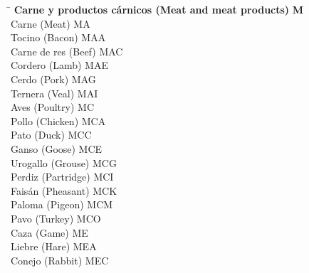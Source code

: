 \begin{small}
    \begin{tabbing}
    \hspace{15cm} \= \hspace{0cm} \kill
        \textbf{Carne y productos cárnicos (Meat and meat products)} \> \textbf{M} \\
            \hspace{0.5cm}Carne (Meat) \> MA \\
                \hspace{1cm}Tocino (Bacon) \> MAA \\
                \hspace{1cm}Carne de res (Beef) \> MAC \\
                \hspace{1cm}Cordero (Lamb) \> MAE \\
                \hspace{1cm}Cerdo (Pork) \> MAG \\
                \hspace{1cm}Ternera (Veal) \> MAI \\
            \hspace{0.5cm}Aves (Poultry) \> MC \\
                \hspace{1cm}Pollo (Chicken) \> MCA \\
                \hspace{1cm}Pato (Duck) \> MCC \\
                \hspace{1cm}Ganso (Goose) \> MCE \\
                \hspace{1cm}Urogallo (Grouse) \> MCG \\
                \hspace{1cm}Perdiz (Partridge) \> MCI \\
                \hspace{1cm}Faisán (Pheasant) \> MCK \\
                \hspace{1cm}Paloma (Pigeon) \> MCM \\
                \hspace{1cm}Pavo (Turkey) \> MCO \\
            \hspace{0.5cm}Caza (Game) \> ME \\
                \hspace{1cm}Liebre (Hare) \> MEA \\
                \hspace{1cm}Conejo (Rabbit) \> MEC \\

\end{tabbing}
\end{small}
